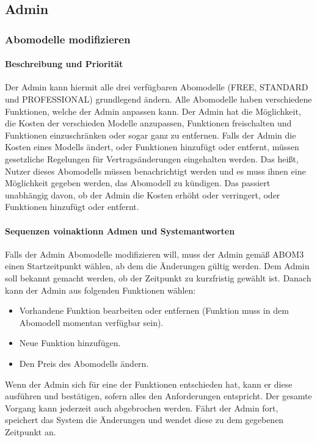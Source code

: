 \subsection{Admin}
\subsubsection{Abomodelle modifizieren}
\paragraph{Beschreibung und Priorität}
Der Admin kann hiermit alle drei verfügbaren Abomodelle (FREE, STANDARD und PROFESSIONAL) grundlegend ändern.
Alle Abomodelle haben verschiedene Funktionen, welche der Admin anpassen kann.
Der Admin hat die Möglichkeit, die Kosten der verschieden Modelle anzupassen, Funktionen freischalten
und Funktionen einzuschränken oder sogar ganz zu entfernen.
Falls der Admin die Kosten eines Modells ändert, oder Funktionen hinzufügt oder entfernt,
müssen gesetzliche Regelungen für Vertragsänderungen eingehalten werden.
Das heißt, Nutzer dieses Abomodells müssen benachrichtigt werden und es muss ihnen eine Möglichkeit gegeben werden,
das Abomodell zu kündigen.
Das passiert unabhängig davon, ob der Admin die Kosten erhöht oder verringert, oder Funktionen hinzufügt oder entfernt.

\paragraph{Sequenzen voinaktionn Admen und Systemantworten}
Falls der Admin Abomodelle modifizieren will, muss der Admin gemäß ABOM3 einen Startzeitpunkt wählen,
ab dem die Änderungen gültig werden.
Dem Admin soll bekannt gemacht werden, ob der Zeitpunkt zu kurzfristig gewählt ist.
Danach kann der Admin aus folgenden Funktionen wählen:
\begin{itemize}
	\item Vorhandene Funktion bearbeiten oder entfernen (Funktion muss in dem Abomodell momentan verfügbar sein).
	\item Neue Funktion hinzufügen.
	\item Den Preis des Abomodells ändern.
\end{itemize}
Wenn der Admin sich für eine der Funktionen entschieden hat, kann er diese ausführen und bestätigen,
sofern alles den Anforderungen entspricht.
Der gesamte Vorgang kann jederzeit auch abgebrochen werden.
Fährt der Admin fort, speichert das System die Änderungen und wendet diese zu dem gegebenen Zeitpunkt an.

